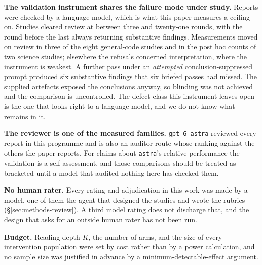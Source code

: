 \textbf{The validation instrument shares the failure mode under study.} Reports were checked by a
language model, which is what this paper measures a ceiling on. Studies cleared review at between
three and twenty-one rounds, with the round before the last always returning substantive
findings. Measurements moved on review in three of the eight general-code studies and in the post hoc
counts of two science studies; elsewhere the refusals concerned
interpretation, where the instrument is weakest. A further pass under an \emph{attempted}
conclusion-suppressed prompt produced six substantive findings that six briefed passes had missed.
The supplied artefacts exposed the conclusions anyway, so blinding was not achieved and the
comparison is uncontrolled. The defect class this instrument leaves open is the one that looks
right to a language model, and we do not know what remains in it.

\textbf{The reviewer is one of the measured families.} \texttt{gpt-6-astra} reviewed every
report in this programme and is also an auditor route whose ranking against the others the paper
reports. For claims about \texttt{astra}'s relative performance the validation is a
self-assessment, and those comparisons should be treated as bracketed until a model that audited
nothing here has checked them.

\textbf{No human rater.} Every rating and adjudication in this work was made by a model, one of
them the agent that designed the studies and wrote the rubrics (\S\ref{sec:methods-review}). A
third model rating does not discharge that, and the design that asks for an outside human rater
has not been run.

\textbf{Budget.} Reading depth $K$, the number of arms, and the size of every intervention
population were set by cost rather than by a power calculation, and no sample size was justified
in advance by a minimum-detectable-effect argument.

